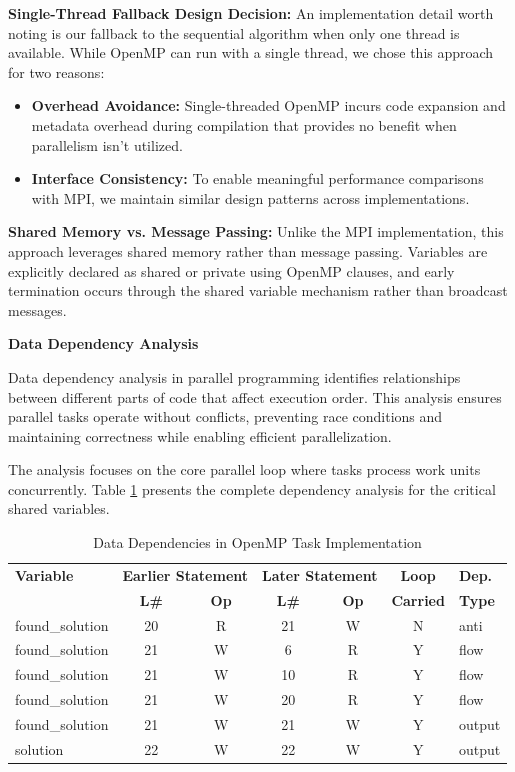 \textbf{Single-Thread Fallback Design Decision:}
An implementation detail worth noting is our fallback to the sequential algorithm when only one thread is available. While OpenMP can run with a single thread, we chose this approach for two reasons:
\begin{itemize}
    \item \textbf{Overhead Avoidance:} Single-threaded OpenMP incurs code expansion and metadata overhead during compilation that provides no benefit when parallelism isn't utilized.
    \item \textbf{Interface Consistency:} To enable meaningful performance comparisons with MPI, we maintain similar design patterns across implementations.
\end{itemize}

\textbf{Shared Memory vs. Message Passing:}
Unlike the MPI implementation, this approach leverages shared memory rather than message passing. Variables are explicitly declared as shared or private using OpenMP clauses, and early termination occurs through the shared variable mechanism rather than broadcast messages.

\textbf{Data Dependency Analysis}

Data dependency analysis in parallel programming identifies relationships between different parts of code that affect execution order. This analysis ensures parallel tasks operate without conflicts, preventing race conditions and maintaining correctness while enabling efficient parallelization.

The analysis focuses on the core parallel loop where tasks process work units concurrently. Table \ref{tab:omp_dependencies_detailed} presents the complete dependency analysis for the critical shared variables.

\begin{table}[htbp]
\caption{Data Dependencies in OpenMP Task Implementation}
\begin{center}
\footnotesize
\begin{tabular}{@{}lcccccl@{}}
\toprule
\textbf{Variable} & \multicolumn{2}{c}{\textbf{Earlier Statement}} & \multicolumn{2}{c}{\textbf{Later Statement}} & \textbf{Loop} & \textbf{Dep.} \\
& \textbf{L\#} & \textbf{Op} & \textbf{L\#} & \textbf{Op} & \textbf{Carried} & \textbf{Type} \\
\midrule
found\_solution & 20 & R & 21 & W & N & anti \\
found\_solution & 21 & W & 6 & R & Y & flow \\
found\_solution & 21 & W & 10 & R & Y & flow \\
found\_solution & 21 & W & 20 & R & Y & flow \\
found\_solution & 21 & W & 21 & W & Y & output \\
solution & 22 & W & 22 & W & Y & output \\
\bottomrule
\end{tabular}
\end{center}
\label{tab:omp_dependencies_detailed}
\end{table}


